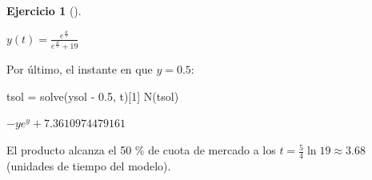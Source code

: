 \documentclass[
  spanish,
  a4paper,
]{scrreport}
\newenvironment{Shaded}{\begin{snugshade}}{\end{snugshade}}
\newcommand{\FloatTok}[1]{\textcolor[rgb]{0.68,0.00,0.00}{#1}}
\newcommand{\FunctionTok}[1]{\textcolor[rgb]{0.28,0.35,0.67}{#1}}
\newcommand{\NormalTok}[1]{\textcolor[rgb]{0.00,0.23,0.31}{#1}}
\newcommand{\OperatorTok}[1]{\textcolor[rgb]{0.37,0.37,0.37}{#1}}
\theoremstyle{definition}
\newtheorem{exercise}{Ejercicio}[chapter]
\theoremstyle{remark}
\begin{document}
\begin{exercise}[]
\begin{tcolorbox}
$y{\left(t \right)} = \frac{e^{\frac{4 t}{5}}}{e^{\frac{4 t}{5}} + 19}$

Por último, el instante en que \(y=0.5\):

\begin{Shaded}
\begin{Highlighting}[]
\NormalTok{tsol }\OperatorTok{=} \FunctionTok{solve}\NormalTok{(ysol }\OperatorTok{{-}} \FloatTok{0.5}\NormalTok{, t)[}\FloatTok{1}\NormalTok{]}
\FunctionTok{N}\NormalTok{(tsol)}
\end{Highlighting}
\end{Shaded}

$- y e^{y} + 7.3610974479161$

El producto alcanza el 50 \% de cuota de mercado a los
\(t = \frac{5}{4}\ln 19 \approx 3.68\) (unidades de tiempo del modelo).

\end{tcolorbox}

\end{exercise}
\end{document}
